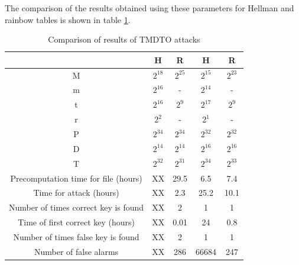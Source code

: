 The comparison of the results obtained using these parameters for Hellman and rainbow tables is shown in table \ref{tab:comparison-results-hellman-rainbow}.

\begin{table}[ht!]
\begin{center}
\begin{tabular}{|c|c c||c c|}
\hline
																				&	H							&	R								&	H								& R							\\ \hline \hline
M																				&	$2^{18}$			&	$2^{25}$				&	$2^{15}$				& $2^{23}$			\\ \hline 
m																				&	$2^{16}$			&		-							&	$2^{14}$				& 	-						\\ \hline 
t																				&	$2^{16}$			&	$2^{9}$					&	$2^{17}$				& $2^{9}$				\\ \hline 
r																				&	$2^{2}$				&		-							&	$2^{1}$					& 	-						\\ \hline 
P																				&	$2^{34}$			&	$2^{34}$				&	$2^{32}$				& $2^{32}$			\\ \hline 
D																				&	$2^{14}$			&	$2^{14}$				&	$2^{16}$				& $2^{16}$			\\ \hline \hline
T																				&	$2^{32}$			&	$2^{31}$				&	$2^{34}$				& $2^{33}$			\\ \hline \hline
Precomputation time for file (hours)		&	XX 	 					&	29.5						&	6.5							&	7.4						\\ \hline
Time for attack	(hours)									&	XX 	 					&	2.3							&	25.2						&	10.1					\\ \hline
Number of times correct key is found 		&	XX 	 					&	2 							&	1 							&	1 						\\ \hline
Time of first correct key (hours)				&	XX 	 					&	0.01						&	24							&	0.8						\\ \hline
Number of times false key is found			&	XX 	 					&	2 							&	1 							&	1 						\\ \hline
Number of false alarms									&	XX 	 					&	286							&	66684						&	247						\\ \hline
\end{tabular}
\end{center} 
\caption{Comparison of results of TMDTO attacks}
\label{tab:comparison-results-hellman-rainbow}
\end{table}

